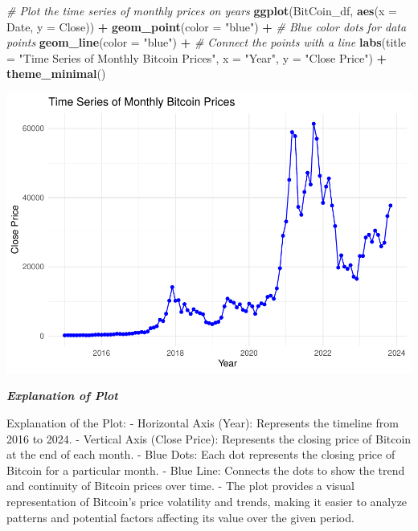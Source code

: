 \documentclass[
]{book}
\newenvironment{Shaded}{\begin{snugshade}}{\end{snugshade}}
\newcommand{\AttributeTok}[1]{\textcolor[rgb]{0.13,0.29,0.53}{#1}}
\newcommand{\CommentTok}[1]{\textcolor[rgb]{0.56,0.35,0.01}{\textit{#1}}}
\newcommand{\FunctionTok}[1]{\textcolor[rgb]{0.13,0.29,0.53}{\textbf{#1}}}
\newcommand{\NormalTok}[1]{#1}
\newcommand{\SpecialCharTok}[1]{\textcolor[rgb]{0.81,0.36,0.00}{\textbf{#1}}}
\newcommand{\StringTok}[1]{\textcolor[rgb]{0.31,0.60,0.02}{#1}}
\begin{document}
\begin{Shaded}
\begin{Highlighting}[]
\CommentTok{\# Plot the time series of monthly prices on years}
\FunctionTok{ggplot}\NormalTok{(BitCoin\_df, }\FunctionTok{aes}\NormalTok{(}\AttributeTok{x =}\NormalTok{ Date, }\AttributeTok{y =}\NormalTok{ Close)) }\SpecialCharTok{+}
  \FunctionTok{geom\_point}\NormalTok{(}\AttributeTok{color =} \StringTok{"blue"}\NormalTok{) }\SpecialCharTok{+} \CommentTok{\# Blue color dots for data points}
  \FunctionTok{geom\_line}\NormalTok{(}\AttributeTok{color =} \StringTok{"blue"}\NormalTok{) }\SpecialCharTok{+}  \CommentTok{\# Connect the points with a line}
  \FunctionTok{labs}\NormalTok{(}\AttributeTok{title =} \StringTok{"Time Series of Monthly Bitcoin Prices"}\NormalTok{,}
       \AttributeTok{x =} \StringTok{"Year"}\NormalTok{,}
       \AttributeTok{y =} \StringTok{"Close Price"}\NormalTok{) }\SpecialCharTok{+}
  \FunctionTok{theme\_minimal}\NormalTok{()}
\end{Highlighting}
\end{Shaded}

\includegraphics{bookdown-demo_files/figure-latex/unnamed-chunk-13-1.pdf}

\emph{\textbf{Explanation of Plot}}

Explanation of the Plot:
- Horizontal Axis (Year): Represents the timeline from 2016 to 2024.
- Vertical Axis (Close Price): Represents the closing price of Bitcoin at the end of each month.
- Blue Dots: Each dot represents the closing price of Bitcoin for a particular month.
- Blue Line: Connects the dots to show the trend and continuity of Bitcoin prices over time.
- The plot provides a visual representation of Bitcoin's price volatility and trends, making it easier to analyze patterns and potential factors affecting its value over the given period.
\end{document}
